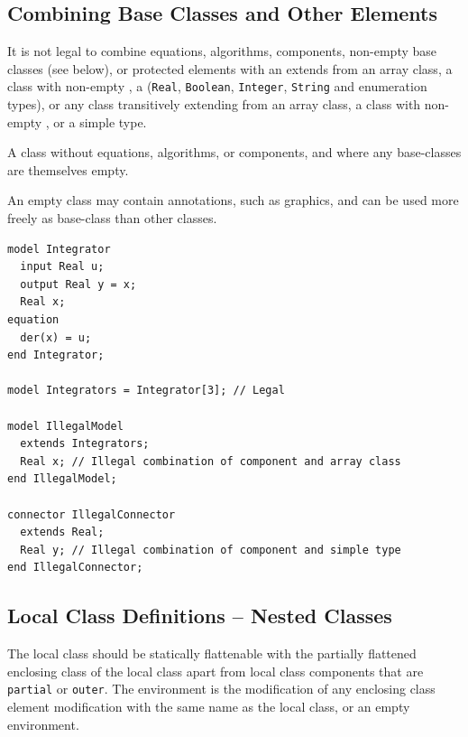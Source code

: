 \subsection{Combining Base Classes and Other Elements}\label{restriction-on-combining-base-classes-and-other-elements}\label{combining-base-classes-and-other-elements}

It is not legal to combine equations, algorithms, components, non-empty base classes (see below), or protected elements with an extends from an array class, a class with non-empty , a  (\lstinline!Real!, \lstinline!Boolean!, \lstinline!Integer!, \lstinline!String! and enumeration types), or any class transitively extending from an array class, a class with non-empty , or a simple type.

\begin{definition}\label{empty-class}
A class without equations, algorithms, or components, and where any base-classes are themselves empty.
\end{definition}

\begin{nonnormative}
An empty class may contain annotations, such as graphics, and can be used more freely as base-class than other classes.
\end{nonnormative}

\begin{example}
\begin{lstlisting}[language=modelica]
model Integrator
  input Real u;
  output Real y = x;
  Real x;
equation
  der(x) = u;
end Integrator;

model Integrators = Integrator[3]; // Legal

model IllegalModel
  extends Integrators;
  Real x; // Illegal combination of component and array class
end IllegalModel;

connector IllegalConnector
  extends Real;
  Real y; // Illegal combination of component and simple type
end IllegalConnector;
\end{lstlisting}
\end{example}

\subsection{Local Class Definitions -- Nested Classes}\label{local-class-definitions-nested-classes}

The local class should be statically flattenable with the partially flattened enclosing class of the local class apart from local class components that are \lstinline!partial! or \lstinline!outer!.
The environment is the modification of any enclosing class element modification with the same name as the local class, or an empty environment.

